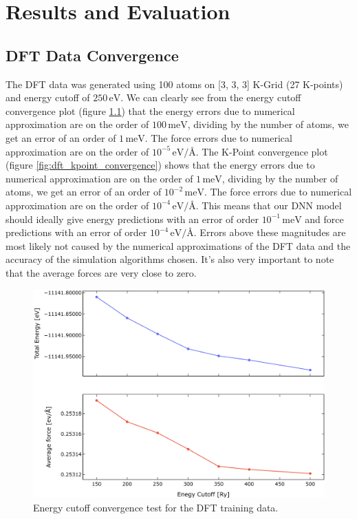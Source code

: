 \chapter{Results and Evaluation}
\label{chap:results-and-evaluation}

\section{DFT Data Convergence}

The DFT data was generated using 100 atoms on [3, 3, 3] K-Grid (27 K-points)
and energy cutoff of $250 \, \mathrm{eV}$. We can clearly see from the energy
cutoff convergence plot (figure \ref{fig:dft_energy_cutoff_convergence}) that
the energy errors due to numerical approximation are on the order of
$100 \, \mathrm{meV}$, dividing by the number of atoms, we get an error of
an order of $1 \, \mathrm{meV}$. The force errors due to numerical
approximation are on the order of $10^{-5} \, \mathrm{eV}/\text{\AA}$. The
K-Point convergence plot (figure \ref{fig:dft_kpoint_convergence}) shows that
the energy errors due to numerical approximation are on the order of
$1 \, \mathrm{meV}$, dividing by the number of atoms, we get an error of an
order of $10^{-2} \, \mathrm{meV}$. The force errors due to numerical
approximation are on the order of $10^{-4} \, \mathrm{eV}/\text{\AA}$. This
means that our DNN model should ideally give energy predictions with an error
of order $10^{-1} \, \mathrm{meV}$ and force predictions with an error of
order $10^{-4} \, \mathrm{eV}/\text{\AA}$. Errors above these magnitudes are
most likely not caused by the numerical approximations of the DFT data and the
accuracy of the simulation algorithms chosen. It's also very important to note
that the average forces are very close to zero.

\begin{figure}
  \begin{center}
    \includegraphics[width=.8\textwidth]{
      asset/cutoff_convergence.jpg
    }
  \end{center}
  \caption{Energy cutoff convergence test for the DFT training data.}
  \label{fig:dft_energy_cutoff_convergence}
\end{figure}

